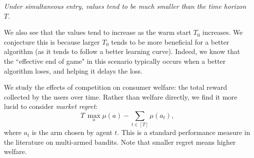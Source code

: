 \documentclass[../competing_bandits_with_appendix.tex]{subfiles}
\begin{document}
\begin{finding}
\textit{
Under simultaneous entry, \Eeog values tend to be much smaller than the time horizon $T$.
}
\end{finding}

We also see that the \Eeog values tend to increase as the warm start $T_0$ increases. We conjecture this is because larger $T_0$ tends to be more beneficial for a better algorithm (as it tends to follow a better learning curve). Indeed, we know that the ``effective end of game" in this scenario typically occurs when a better algorithm loses, and helping it delays the loss.


We study the effects of competition on consumer welfare: the total reward collected by the users over time. Rather than welfare directly, we find it more lucid to consider
\emph{market regret}:
\[ \textstyle T\, \max_a \mu(a) - \sum_{t\in [T]} \mu(a_t), \]
where $a_t$ is the arm chosen by agent $t$. This is a standard performance measure in the literature on multi-armed bandits. Note that smaller regret means higher welfare.
\end{document}
